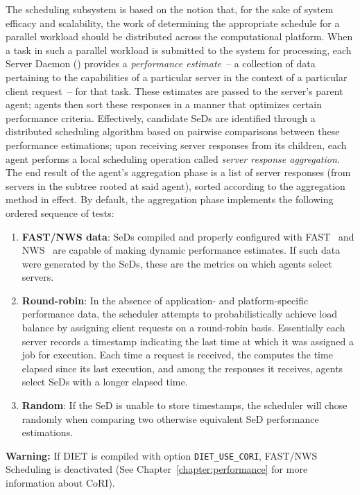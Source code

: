 The \diet scheduling subsystem is based on the notion that, for the
sake of system efficacy and scalability, the work of determining the
appropriate schedule for a parallel workload should be distributed
across the computational platform.  When a task in such a parallel
workload is submitted to the system for processing, each Server Daemon
(\sed) provides a \emph{performance estimate}~-- a collection of data
pertaining to the capabilities of a particular server in the context
of a particular client request~-- for that task.  These estimates are
passed to the server's parent agent; agents then sort these responses
in a manner that optimizes certain performance criteria.  Effectively,
candidate SeDs are identified through a distributed scheduling
algorithm based on pairwise comparisons between these performance
estimations; upon receiving server responses from its children, each
agent performs a local scheduling operation called \emph{server
response aggregation}.  The end result of the agent's aggregation
phase is a list of server responses (from servers in the subtree
rooted at said agent), sorted according to the aggregation method in
effect.  By default, the aggregation phase implements the following
ordered sequence of tests:

\begin{enumerate}
\item \textbf{FAST/NWS data}: SeDs compiled and properly configured
  with FAST~\cite{Qui02} and NWS~\cite{WSH99} are capable of making
  dynamic performance estimates.  If such data were generated by the
  SeDs, these are the metrics on which agents select servers.
\item \textbf{Round-robin}: In the absence of application- and
  platform-specific performance data, the \diet scheduler attempts to
  probabilistically achieve load balance by assigning client requests
  on a round-robin basis.  Essentially each server records a timestamp
  indicating the last time at which it was assigned a job for
  execution.  Each time a request is received, the \sed computes the
  time elapsed since its last execution, and among the responses it
  receives, \diet agents select SeDs with a longer elapsed time.
\item \textbf{Random}: If the SeD is unable to store timestamps, the
  \diet scheduler will chose randomly when comparing two otherwise
  equivalent SeD performance estimations.
\end{enumerate}

\textbf{Warning:} If DIET is compiled with option \texttt{DIET\_USE\_CORI},
FAST/NWS Scheduling is deactivated (See
Chapter~\ref{chapter:performance} for more information about CoRI).

